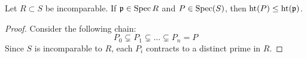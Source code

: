 \documentclass{ximera}
\begin{document}
\begin{proposition}
  Let $R\subset S$ be incomparable. If $\mathfrak{p}\in\operatorname{Spec}{R}$ and $P\in\operatorname{Spec}(S)$, then $\operatorname{ht}(P)\le \operatorname{ht}(\mathfrak{p})$.
  \begin{proof}
    Consider the following chain:
    \[
    P_0 \subsetneq P_1 \subsetneq \dots \subsetneq P_n = P
    \]
    Since $S$ is incomparable to $R$, each $P_i$ contracts to a distinct prime in $R$. 
  \end{proof}
\end{proposition}
\end{document}
